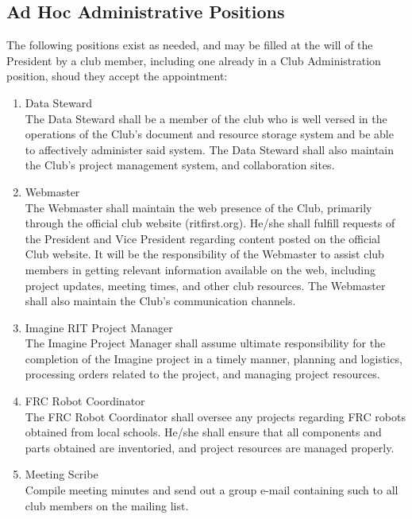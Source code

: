 \documentclass[english,11pt]{article}
\begin{document}
\subsection{Ad Hoc Administrative Positions} \label{sect:cadmin:adhoc}
The following positions exist as needed, and may be filled at the will of the President by a club member, including one already in a Club Administration position, shoud they accept the appointment:

\begin{enumerate}[label=\Alph*.]
\item {\large Data Steward} \\
        The Data Steward shall be a member of the club who is well versed in the operations of the Club's document and resource storage system and be able to affectively administer said system.
        The Data Steward shall also maintain the Club's project management system, and collaboration sites.
\item {\large Webmaster} \\
        The Webmaster shall maintain the web presence of the Club, primarily through the official club website (ritfirst.org).
        He/she shall fulfill requests of the President and Vice President regarding content posted on the official Club website.
        It will be the responsibility of the Webmaster to assist club members in getting relevant information available on the web, including project updates, meeting times, and other club resources.
        The Webmaster shall also maintain the Club's communication channels.
\item {\large Imagine RIT Project Manager} \\
        The Imagine Project Manager shall assume ultimate responsibility for the completion of the Imagine project in a timely manner, planning and logistics, processing orders related to the project, and managing project resources.
\item {\large FRC Robot Coordinator} \\
        The FRC Robot Coordinator shall oversee any projects regarding FRC robots obtained from local schools. He/she shall ensure that all components and parts obtained are inventoried, and project resources are managed properly.
\item {\large Meeting Scribe} \\
        Compile meeting minutes and send out a group e-mail containing such to all club members on the mailing list.
\end{enumerate}
\end{document}
